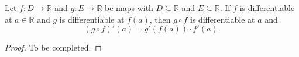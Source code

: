 \begin{theorem}
  Let $f: D \to \mathbb{R}$ and $g: E \to \mathbb{R}$ be maps with
  $D \subseteq \mathbb{R}$ and $E \subseteq \mathbb{R}$.
  If $f$ is differentiable at $a \in \mathbb{R}$ and $g$ is differentiable at
  $f(a)$, then $g \circ f$ is differentiable at $a$ and
  \begin{equation*}
    (g \circ f)'(a) = g'(f(a)) \cdot f'(a).
  \end{equation*}
\end{theorem}
\begin{proof}
  To be completed.
\end{proof}